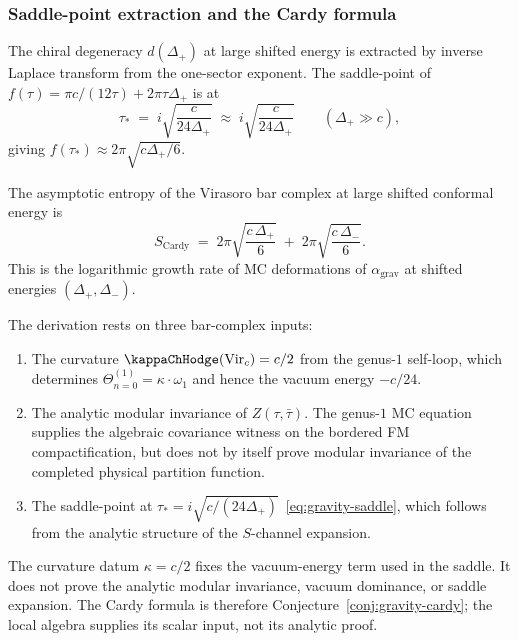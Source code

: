 \subsubsection*{Saddle-point extraction and the Cardy formula}

The chiral degeneracy $d(\Delta_+)$ at large shifted energy is
extracted by inverse Laplace transform from the one-sector exponent.
The
saddle-point of $f(\tau) = \pi c/(12\tau) + 2\pi\tau\Delta_+$
is at
\begin{equation}\label{eq:gravity-saddle}
\tau_*
\;=\;
i\sqrt{\frac{c}{24\Delta_+}}
\;\approx\;
i\sqrt{\frac{c}{24\Delta_+}}
\qquad (\Delta_+ \gg c),
\end{equation}
giving $f(\tau_*) \approx 2\pi\sqrt{c\Delta_+/6}$.

\begin{conjecture}
\label{conj:gravity-cardy}
\label{conj:cardy-mc}
The asymptotic entropy of the Virasoro bar complex at large
shifted conformal energy is
\begin{equation}\label{eq:gravity-cardy}
\boxed{
S_{\mathrm{Cardy}}
\;=\;
2\pi\sqrt{\frac{c\,\Delta_+}{6}}
\;+\;
2\pi\sqrt{\frac{c\,\Delta_-}{6}}.
}
\end{equation}
This is the logarithmic growth rate of MC deformations
of $\alpha_{\mathrm{grav}}$ at shifted energies
$(\Delta_+,\Delta_-)$.
\end{conjecture}

\begin{remark}
\label{rem:cardy-derivation}
The derivation rests on three bar-complex inputs:
\begin{enumerate}[label=(\roman*)]
\item The curvature $\kappaChHodge(\mathrm{Vir}_c) = c/2$ from the
 genus-$1$ self-loop, which determines
 $\Theta^{(1)}_{n=0} = \kappa\cdot\omega_1$ and hence the
 vacuum energy $-c/24$.
\item The analytic modular invariance of $Z(\tau,\bar\tau)$.
 The genus-$1$ MC equation supplies the algebraic covariance
 witness on the bordered FM compactification, but does not by
 itself prove modular invariance of the completed physical
 partition function.
\item The saddle-point at
 $\tau_* = i\sqrt{c/(24\Delta_+)}$~\eqref{eq:gravity-saddle},
 which follows from the analytic structure of the
 $S$-channel expansion.
\end{enumerate}
The curvature datum $\kappa = c/2$ fixes the vacuum-energy term
used in the saddle. It does not prove the analytic modular
invariance, vacuum dominance, or saddle expansion. The Cardy
formula is therefore Conjecture~\ref{conj:gravity-cardy}; the
local algebra supplies its scalar input, not its analytic proof.
\end{remark}

